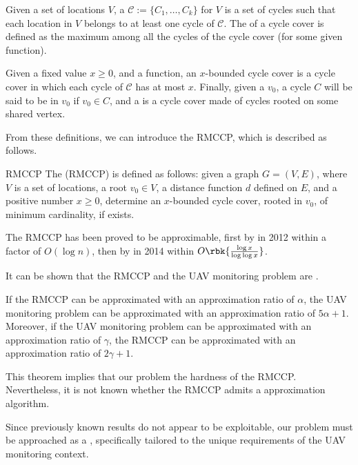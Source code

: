 \documentclass[a4paper, 12pt]{report}
\begin{document}
    Given a set of locations $V$, a  $\mathcal C := \{C_1, \ldots, C_k\}$ for $V$ is a set of cycles such that each location in $V$ belongs to at least one cycle of $\mathcal C$. The  of a cycle cover is defined as the maximum  among all the cycles of the cycle cover (for some given  function).

    Given a fixed value $x \ge 0$, and a  function, an $x$-bounded cycle cover is a cycle cover in which each cycle of $\mathcal C$ has  at most $x$. Finally, given a  $v_0$, a cycle $C$ will be said to be  in $v_0$ if $v_0 \in C$, and a  is a cycle cover made of cycles rooted on some shared vertex.

    From these definitions, we can introduce the RMCCP, which is described as follows.

    \begin{frameddefn}{RMCCP}
        The  (RMCCP) is defined as follows: given a graph $G = (V, E)$, where $V$ is a set of locations, a root $v_0 \in V$, a distance function $d$ defined on $E$, and a positive number $x \ge 0$, determine an $x$-bounded cycle cover, rooted in $v_0$, of minimum cardinality, if exists.
    \end{frameddefn}

    The RMCCP has been proved to be approximable, first by \textcite{nagarajan} in 2012 within a factor of $O(\log n)$, then by \textcite{friggstad} in 2014 within $O\rbk{\frac{\log x}{\log \log x}}$.

    It can be shown that the RMCCP and the UAV monitoring problem are .

    \begin{framedthm}{}
        If the RMCCP can be approximated with an approximation ratio of $\alpha$, the UAV monitoring problem can be approximated with an approximation ratio of $5 \alpha + 1$. Moreover, if the UAV monitoring problem can be approximated with an approximation ratio of $\gamma$, the RMCCP can be approximated with an approximation ratio of $2 \gamma + 1$.
    \end{framedthm}

    This theorem implies that our problem  the hardness of the RMCCP. Nevertheless, it is not known whether the RMCCP admits a  approximation algorithm.

    Since previously known results do not appear to be exploitable, our problem must be approached as a , specifically tailored to the unique requirements of the UAV monitoring context.
\end{document}
